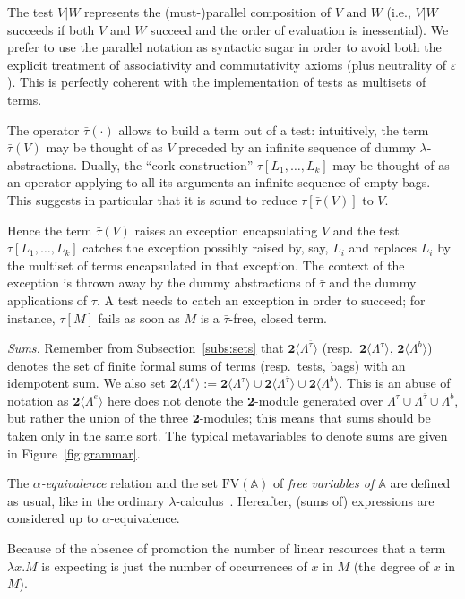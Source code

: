 \documentclass{LMCS}
\newcommand{\bool}{\mathbf{2}}
\newcommand{\lam}{\ensuremath{\lambda}}
\newcommand{\paral}{\vert}
\newcommand{\FV}{\mathrm{FV}}
\newcommand{\Set}[1]{\Lambda^{#1}}
\newcommand{\sums}[1]{\bool\langle\Set{#1}\rangle}
\newcommand{\ass}{:=}
\newcommand{\sA}{\mathbb{A}}
\newcommand{\gt}{\ensuremath{\tau}}
\newcommand{\gto}{\ensuremath{\bar\tau}}
\begin{document}
The test $V\paral W$ represents the (must-)parallel composition of $V$ and $W$ (i.e., $V\paral W$ succeeds if both $V$ and $W$ succeed and the order of evaluation is
 inessential). We prefer to use the parallel notation as syntactic sugar in order to avoid both the explicit treatment of associativity and commutativity axioms
 (plus neutrality of $\varepsilon$). This is perfectly coherent with the implementation of tests as multisets of terms.


\label{pageref:gto} The operator $\gto(\cdot)$ allows to build a term out of a test:
intuitively, the term $\gto(V)$ may be thought of as $V$ preceded by 
an infinite sequence of dummy $\lambda$-abstractions. 
Dually, the ``cork construction'' $\gt[L_1,\ldots,L_k]$ may be thought of as 
an operator applying to all its arguments an infinite sequence of empty bags.
This suggests in particular that it is sound to reduce $\gt[\gto(V)]$
to $V$.


Hence the term $\gto(V)$ raises an exception 
encapsulating $V$ and the test $\gt[L_1,\ldots,L_k]$
catches the exception possibly raised by, say, $L_i$ and replaces $L_i$
by the multiset of terms encapsulated in that exception.
The context of the exception is thrown away by the 
dummy abstractions of $\gto$ and the dummy applications of  $\gt$.
A test needs to catch an exception in order to succeed; for instance,
$\gt[M]$ fails as soon as $M$ is a $\gto$-free, closed term.

{\em Sums.} 
Remember from Subsection~\ref{subs:sets} that $\sums{\gto}$ (resp.\ $\sums{\gt}$, $\sums{b}$) 
denotes the set of finite formal sums of terms (resp.\ tests, bags)
with an idempotent sum.
We also set $\sums{e} \ass \sums{\gt}\cup\sums{\gto}\cup\sums{b}$.
This is an abuse of notation as $\sums{e}$ here does not denote the $\bool$-module generated over 
$\Set{\gt}\cup\Set{\gto}\cup\Set{b}$, but rather the union of the three  $\bool$-modules;
this means that sums should be taken only in the same sort.
The typical metavariables to denote sums are given in Figure~\ref{fig:grammar}.



The \emph{$\alpha$-equivalence} relation and the set $\FV(\sA)$ of \emph{free variables of $\sA$} are defined 
as usual, like in the ordinary \lam-calculus~\cite{Bare}.
Hereafter, (sums of) expressions are considered up to $\alpha$-equivalence.

Because of the absence of promotion the number of linear resources that a term $\lam x.M$ is expecting is just the number of occurrences of $x$ in $M$
 (the degree of $x$ in $M$).
\end{document}
